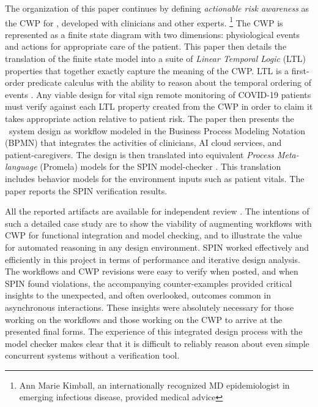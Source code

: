 The organization of this paper continues by defining \emph{actionable risk awareness} as the CWP for \phware, developed with clinicians and other experts. \footnote{Ann Marie Kimball, an internationally recognized MD epidemiologist in emerging infectious disease, provided medical advice}
The CWP is represented as a finite state diagram with two dimensions: physiological events and actions for appropriate care of the patient.
This paper then details the translation of the finite state model into a suite of \emph{Linear Temporal Logic} (LTL) properties that together exactly capture the meaning of the CWP.
LTL is a first-order predicate calculus with the ability to reason about the temporal ordering of events \cite{10.5555/975331}.
Any viable design for vital sign remote monitoring of COVID-19 patients must verify against each LTL property created from the CWP in order to claim it takes appropriate action relative to patient risk.
The paper then presents the \phware\ system design as workflow modeled in the Business Process Modeling Notation (BPMN) \cite{BPMN} that integrates the activities of clinicians, AI cloud services, and patient-caregivers.
The design is then translated into equivalent \emph{Process Meta-language} (Promela) models for the SPIN model-checker \cite{spin}.
This translation includes behavior models for the environment inputs such as patient vitals.
The paper reports the SPIN verification results.

All the reported artifacts are available for independent review \cite{repo}.
The intentions of such a detailed case study are to show the viability of augmenting workflows with CWP for functional integration and model checking, and to illustrate the value for automated reasoning in any design environment.
SPIN worked effectively and efficiently in this project in terms of performance and iterative design analysis.
The workflows and CWP revisions were easy to verify when posted, and when SPIN found violations, the accompanying counter-examples provided critical insights to the unexpected, and often overlooked, outcomes common in asynchronous interactions.
These insights were absolutely necessary for those working on the workflows and those working on the CWP to arrive at the presented final forms.
The experience of this integrated design process with the model checker makes clear that it is difficult to reliably reason about even simple concurrent systems without a verification tool.